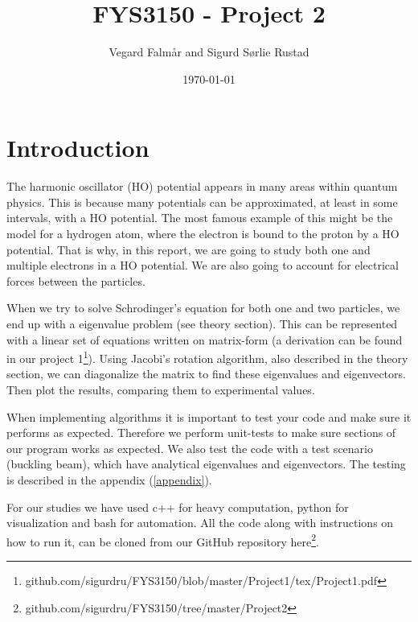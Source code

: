\documentclass[reprint,english,notitlepage,nofootinbib]{revtex4-1}  %
\begin{document}
\title{FYS3150 - Project 2}
\date{\today}
\author{Vegard Falmår and Sigurd Sørlie Rustad}

\newpage

\begin{abstract}

\end{abstract}
\maketitle


\section{Introduction}

The harmonic oscillator (HO) potential appears in many areas within quantum physics. This is because many potentials can be approximated, at least in some intervals, with a HO potential. The most famous example of this might be the model for a hydrogen atom, where the electron is bound to the proton by a HO potential. That is why, in this report, we are going to study both one and multiple electrons in a HO potential. We are also going to account for electrical forces between the particles.

When we try to solve Schrodinger's equation for both one and two particles, we end up with a eigenvalue problem (see theory section). This can be represented with a linear set of equations written on matrix-form (a derivation can be found in our project 1\footnote{github.com/sigurdru/FYS3150/blob/master/Project1/tex/Project1.pdf}). Using Jacobi's rotation algorithm, also described in the theory section, we can diagonalize the matrix to find these eigenvalues and eigenvectors. Then plot the results, comparing them to experimental values.

When implementing algorithms it is important to test your code and make sure it performs as expected. Therefore we perform unit-tests to make sure sections of our program works as expected. We also test the code with a test scenario (buckling beam), which have analytical eigenvalues and eigenvectors. The testing is described in the appendix (\ref{appendix}).

For our studies we have used c++ for heavy computation, python for visualization and bash for automation. All the code along with instructions on how to run it, can be cloned from our GitHub repository here\footnote{github.com/sigurdru/FYS3150/tree/master/Project2}.
\end{document}
